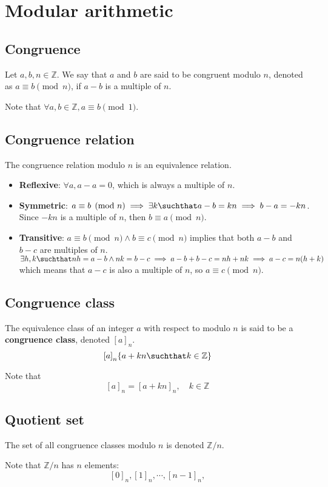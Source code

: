 \documentclass[a4paper]{article}
\begin{document}

\pagebreak

\section{Modular arithmetic}

\subsection{Congruence}

Let \(a,b,n\in\mathbb{Z}\).
We say that \(a\) and \(b\) are said to be congruent modulo \(n\),
denoted as \(a \equiv b \pmod{n}\), if \(a-b\) is a multiple of \(n\).

Note that \(\forall a,b \in \mathbb{Z}, a \equiv b \pmod{1}\).

\subsection{Congruence relation}

The congruence relation modulo \(n\) is an equivalence relation.

\begin{itemize}
    \item \textbf{Reflexive}: \(\forall a, a-a = 0\), which is always a multiple of \(n\).
    \item \textbf{Symmetric}: \(a \equiv b \pmod{n} \implies \exists k \suchthat a-b=kn \implies b-a=-kn\).
    Since \(-kn\) is a multiple of \(n\), then \(b \equiv a \pmod{n}\).
    \item \textbf{Transitive}: \(a \equiv b \pmod{n} \land b \equiv c \pmod{n}\) implies that both
    \(a-b\) and \(b - c\) are multiples of \(n\).
    \(\exists h, k \suchthat nh=a-b \land nk=b-c \implies a-b+b-c=nh+nk \implies a-c=n(h+k)\)
    which means that \(a-c\) is also a multiple of \(n\), so \(a \equiv c \pmod{n}\).
\end{itemize}

\subsection{Congruence class}

The equivalence class of an integer \(a\) with respect to modulo \(n\)
is said to be a \textbf{congruence class}, denoted \({[a]}_n\).
\[
    {[a]}_n \{a+kn \suchthat k \in \mathbb{Z}\}
\]

Note that
\[
    {[a]}_n = {[a + kn]}_n,\quad k \in \mathbb{Z}
\]

\subsection{Quotient set}

The set of all congruence classes modulo \(n\) is denoted \(\mathbb{Z} / n\).

Note that \(\mathbb{Z} / n\) has \(n\) elements:
\[
    {[0]}_n,{[1]}_n,\cdots,{[n-1]}_n,
\]


\end{document}
